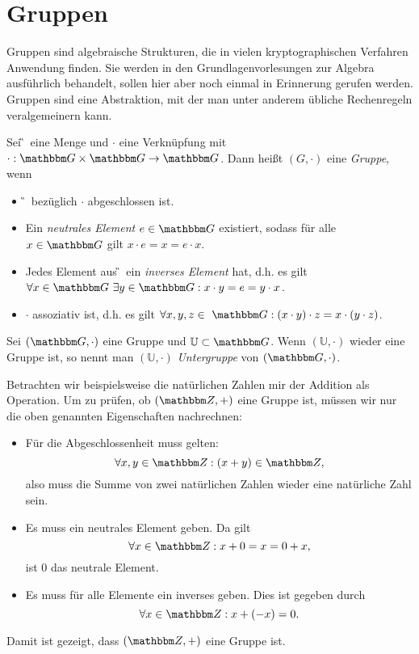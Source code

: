 
\chapter{Gruppen}
Gruppen sind algebraische Strukturen, die in vielen kryptographischen
Verfahren Anwendung finden. Sie werden in den Grundlagenvorlesungen zur
Algebra ausführlich behandelt, sollen hier aber noch einmal in
Erinnerung gerufen werden. Gruppen sind eine Abstraktion, mit der man
unter anderem übliche Rechenregeln veralgemeinern kann.

\begin{definition}[Gruppe]
Sei \G~eine Menge und $\cdot$ eine Verknüpfung mit $\cdot: \G\times \G \to
\G$. Dann heißt $(G, \cdot)$ eine \textit{Gruppe}, wenn
\begin{itemize}
\item \G~bezüglich $\cdot$ abgeschlossen ist.
\item Ein \textit{neutrales Element}  $e \in \G$ existiert, sodass für
  alle $x \in \G$ gilt 
  $x\cdot e=x=e\cdot x$.
\item Jedes Element aus \G~ein \textit{inverses Element} hat, d.h. es gilt $\forall x \in
  \G~ \exists y \in \G: x\cdot y=e=y\cdot x$.
\item $\cdot$ assoziativ ist,  d.h. es gilt $\forall x, y, z  \in ~\G:
  (x\cdot y)\cdot z = x\cdot(y \cdot z)$.
\end{itemize}
\end{definition}
\begin{definition}[Untergruppe]
  Sei $(\G, \cdot)$ eine Gruppe und $\mathbb{U} \subset \G$. Wenn
  $(\mathbb{U}, \cdot)$ wieder eine Gruppe ist, so nennt man $(\mathbb{U},
  \cdot)$ \textit{Untergruppe} von $(\G, \cdot)$.
\end{definition}


\begin{beispiel}
  Betrachten wir beispielsweise die natürlichen Zahlen mir der Addition
  als Operation. Um zu prüfen, ob \((\Z{}, +)\) eine Gruppe ist, müssen
  wir nur die oben genannten Eigenschaften nachrechnen:
  \begin{itemize}
  \item Für die Abgeschlossenheit muss gelten: 
\[\forall x, y \in \Z{}: (x+y)\in \Z{}, \] 
also muss die Summe von zwei natürlichen Zahlen
    wieder eine natürliche Zahl sein.
  \item Es muss ein neutrales Element geben. Da gilt 
    \[\forall x \in \Z{}: x+0 = x = 0+x, \] ist $0$ das neutrale Element.
  \item Es muss für alle Elemente ein inverses geben. Dies ist gegeben
    durch \[\forall x \in \Z{}: x + (-x) = 0.\]
  \end{itemize}
  Damit ist gezeigt, dass $(\Z{}, +)$ eine Gruppe ist.
\end{beispiel}



